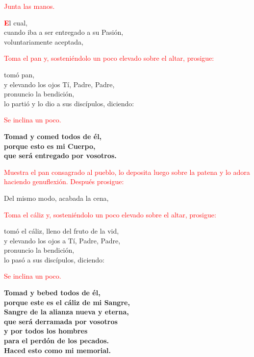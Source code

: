 \documentclass[12pt, letterpaper]{report}
\begin{document}
	\large{\textcolor{red}{Junta las manos.}}

	\lettrine[lines=2]{\bfseries \textcolor{red}{E}}{}\Large l cual,\\
	cuando iba a ser entregado a su Pasi\'on,\\
	voluntariamente aceptada,

	\large{\textcolor{red}{Toma el pan y, sosteni\'endolo un poco elevado sobre el altar, prosigue:}}

	\noindent
	\Large tom\'o pan,\\
	y elevando los ojos T\'i, Padre, Padre,\\
	pronuncio la bendici\'on, \\
	lo parti\'o y lo dio a sus disc\'ipulos, diciendo:

	\large{\textcolor{red}{Se inclina un poco.}}

	\noindent
	\LARGE{\bfseries{Tomad y comed todos de \'el,\\
	porque esto es mi Cuerpo,\\
	que ser\'a entregado por vosotros.}}

	\newpage

	\large{\textcolor{red}{Muestra el pan consagrado al pueblo, lo deposita luego sobre la patena y lo adora haciendo genuflexi\'on. Despu\'es prosigue:}}

	\noindent
	\Large Del mismo modo, acabada la cena,

	\large{\textcolor{red}{Toma el c\'aliz y, sosteni\'endolo un poco elevado sobre el altar, prosigue:}}

	\noindent
	\Large tom\'o el c\'aliz, lleno del fruto de la vid,\\
	y elevando los ojos a T\'i, Padre, Padre,\\
	pronuncio la bendici\'on,\\
	lo pas\'o a sus disc\'ipulos, diciendo:

	\large{\textcolor{red}{Se inclina un poco.}}

	\noindent
	\LARGE{\bfseries{Tomad y bebed todos de \'el,\\
	porque este es el c\'aliz de mi Sangre,\\
	Sangre de la alianza nueva y eterna,\\
	que ser\'a derramada por vosotros\\
	y por todos los hombres\\
	para el perd\'on de los pecados.\\
	Haced esto como mi memorial.}}
\end{document}
